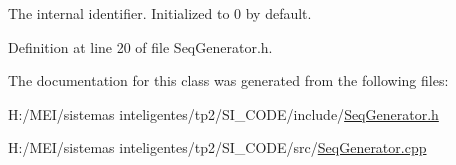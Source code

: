 The internal identifier. Initialized to 0 by default. 

Definition at line 20 of file Seq\+Generator.\+h.



The documentation for this class was generated from the following files\+:\begin{DoxyCompactItemize}
\item 
H\+:/\+M\+E\+I/sistemas inteligentes/tp2/\+S\+I\+\_\+\+C\+O\+D\+E/include/\hyperlink{_seq_generator_8h}{Seq\+Generator.\+h}\item 
H\+:/\+M\+E\+I/sistemas inteligentes/tp2/\+S\+I\+\_\+\+C\+O\+D\+E/src/\hyperlink{_seq_generator_8cpp}{Seq\+Generator.\+cpp}\end{DoxyCompactItemize}
